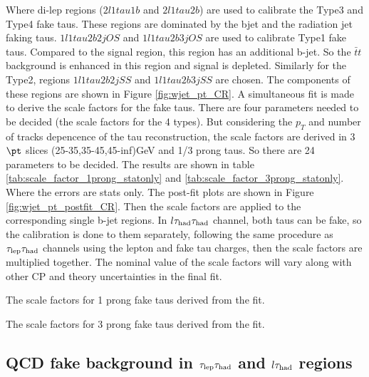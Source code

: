Where di-lep regions ($2l1tau1b$ and $2l1tau2b$) are used to calibrate the Type3 and Type4 fake taus. These regions are dominated by the bjet and the radiation jet faking taus. $1l1tau2b2j OS$ and $1l1tau2b3j OS$ are used to calibrate Type1 fake taus. Compared to the signal region, this region has an additional b-jet. So the $\bar{t}t$ background is enhanced in this region and signal is depleted. Similarly for the Type2, regions $1l1tau2b2j SS$ and $1l1tau2b3j SS$ are chosen. The components of these regions are shown in Figure \ref{fig:wjet_pt_CR}. A simultaneous fit is made to derive the scale factors for the fake taus. There are four parameters needed to be decided (the scale factors for the 4 types). But considering the $p_{T}$ and number of tracks depencence of the tau reconstruction, the scale factors are derived in 3 $\pt$ slices (25-35,35-45,45-inf)GeV and 1/3 prong taus. So there are 24 parameters to be decided. The results are shown in table \ref{tab:scale_factor_1prong_statonly} and \ref{tab:scale_factor_3prong_statonly}. Where the errors are stats only. The post-fit plots are shown in Figure \ref{fig:wjet_pt_postfit_CR}. Then the scale factors are applied to the corresponding single b-jet regions. In $l\tau_\text{had}{}\tau_\text{had}$ channel, both taus can be fake, so the calibration is done to them separately, following the same procedure as $\tau_\text{lep}{}\tau_\text{had}$ channels using the lepton and fake tau charges, then the scale factors are multiplied together. The nominal value of the scale factors will vary along with other CP and theory uncertainties in the final fit.

\begin{table}
\caption{The scale factors for 1 prong fake taus derived from the fit.}
\label{tab:scale_factor_1prong_statonly}

\end{table}
\begin{table}
\caption{The scale factors for 3 prong fake taus derived from the fit.}
\label{tab:scale_factor_3prong_statonly}

\end{table}





\subsection{QCD fake background in $\tau_\text{lep}{}\tau_\text{had}$ and $l\tau_\text{had}$ regions}

